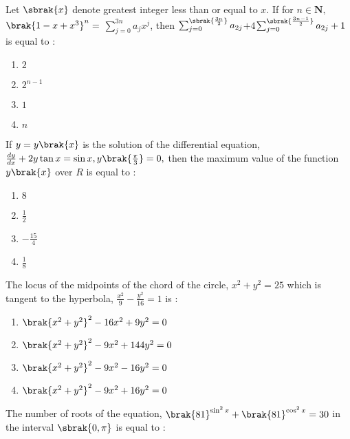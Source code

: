\iffalse
 	\title{2021}
 	\author{EE24BTECH11008}
 	\section{mcq-single}
\fi
    \item Let $\sbrak{x}$ denote greatest integer less than or equal to $x.$ If for $n \in \textbf{N},$ $\brak{1-x+x^3}^n=$ $\sum_{j=0}^{3n}a_jx^j$, then $\sum_{j=0}^{\sbrak{\frac{3n}{2}}}a_{2j}$$+4$$\sum_{j=0}^{\sbrak{\frac{3n-1}{2}}}a_{2j}+1$ is equal to $:$
	    \hfill{} \\
    \begin{enumerate}
        \item $2$
        \item $2^{n-1}$
        \item $1$
        \item $n$
    \end{enumerate}
    \item If $y=y\brak{x}$ is the solution of the differential equation, $\frac{dy}{dx}+2y\tan x=\sin x,y\brak{\frac{\pi}{3}}=0,$ then the maximum value of the function $y\brak{x}$ over $R$ is equal to $:$
	    \hfill{} \\
    \begin{enumerate}
        \item $8$
        \item $\frac{1}{2}$
        \item $-\frac{15}{4}$
        \item $\frac{1}{8}$
    \end{enumerate}
    \item The locus of the midpoints of the chord of the circle, $x^2+y^2=25$ which is tangent to the hyperbola, $\frac{x^2}{9}-\frac{y^2}{16}=1$ is $:$
	    \hfill{} \\
    \begin{enumerate}
        \item $\brak{x^2+y^2}^2-16x^2+9y^2=0$
        \item $\brak{x^2+y^2}^2-9x^2+144y^2=0$
        \item $\brak{x^2+y^2}^2-9x^2-16y^2=0$
        \item $\brak{x^2+y^2}^2-9x^2+16y^2=0$
    \end{enumerate}
    \item The number of roots of the equation, $\brak{81}^{\sin^2x} +\brak{81}^{\cos^2x} =30$ in the interval $\sbrak{0, \pi}$ is equal to $:$
	    \hfill{}  \\

